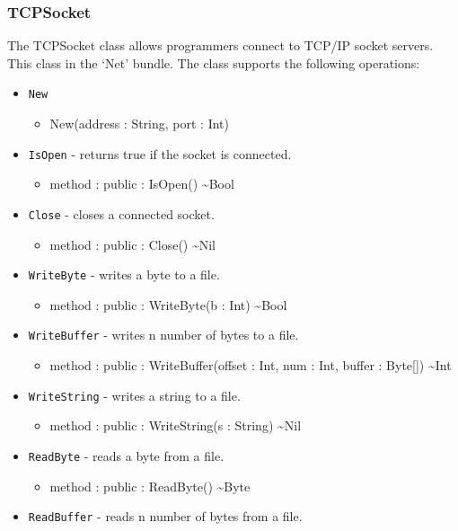 \documentclass[12pt]{article}
\begin{document}
\subsubsection{TCPSocket}
The TCPSocket class allows programmers connect to TCP/IP socket
servers.  This class in the `Net' bundle.  The class supports the
following operations:
\begin{itemize}
\item \texttt{New}
  \begin{itemize}
  \item New(address : String, port : Int)
  \end{itemize}
\item \texttt{IsOpen} - returns true if the socket is connected.
  \begin{itemize}
  \item method : public : IsOpen() \textasciitilde Bool
  \end{itemize}
\item \texttt{Close} - closes a connected socket.
  \begin{itemize}
  \item method : public : Close() \textasciitilde Nil
  \end{itemize}
\item \texttt{WriteByte} - writes a byte to a file.
  \begin{itemize}
  \item method : public : WriteByte(b : Int) \textasciitilde Bool
  \end{itemize}
\item \texttt{WriteBuffer} - writes n number of bytes to a file.
  \begin{itemize}
  \item method : public : WriteBuffer(offset : Int, num : Int, buffer
    : Byte[]) \textasciitilde Int
  \end{itemize}
\item \texttt{WriteString} - writes a string to a file.
  \begin{itemize}
  \item method : public : WriteString(s : String) \textasciitilde Nil
  \end{itemize}
\item \texttt{ReadByte} - reads a byte from a file.
  \begin{itemize}
  \item method : public : ReadByte() \textasciitilde Byte
  \end{itemize}
\item \texttt{ReadBuffer} - reads n number of bytes from a file.

\end{itemize}
\end{document}
